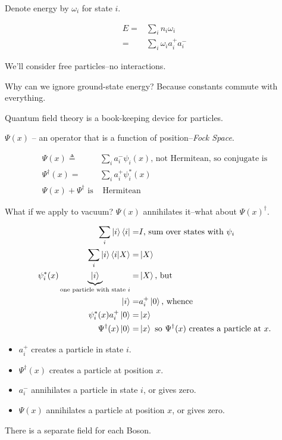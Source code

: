 \documentclass[]{article}
\begin{document}
Denote energy by $\omega_i$ for state $i$. 

\begin{align*}
E =& \sum_{i} n_i \omega_i\\
=& \sum_{i} \omega_i a^+_i a^-_i 
\end{align*}

We'll consider free particles--no interactions.

Why can we ignore ground-state energy? Because constants commute with everything. 

Quantum field theory is a book-keeping device for particles.

$\Psi(x)$ -- an operator that is a function of position--\emph{Fock Space}.

\begin{align*}
\Psi(x)\triangleq&\sum_{i}a^-_i\psi_i(x)\text{, not Hermitean, so conjugate is}\\
\Psi^\dagger(x)=&\sum_{i}a^+_i\psi_i^*(x)\\
\Psi(x)+\Psi^\dagger \text{ is}&\text{ Hermitean}
\end{align*}

What if we apply to vacuum? $\Psi(x)$ annihilates it--what about $\Psi(x)^\dagger$.

\begin{align*}
\sum_{i} \ket{i} \bra{i} =& I \text{, sum over states with $\psi_i$}\\
\sum_{i} \ket{i} \braket{i|X} =& \ket{X}\\
\psi^*_i(x)\underbrace{\ket{i}}_\text{one particle with state $i$} =& \ket{X}\text{, but}\\
\ket{i} =& a^+_i\ket{0} \text{, whence}\\
\psi^*_i(x) a^+_i\ket{0}=&\ket{x}\\
\Psi^\dagger(x) \ket{0} =& \ket{x}\text{ so $\Psi^\dagger(x)$ creates a particle at $x$.}
\end{align*}

\begin{itemize}
	\item $a^+_i$ creates a particle in state $i$.
	\item $\Psi^\dagger(x)$  creates a particle at position $x$.
	\item $a^-_i$ annihilates a particle in state $i$, or gives zero.
	\item $\Psi(x)$  annihilates a particle at position $x$, or gives zero.
\end{itemize}

There is a separate field for each Boson.
\end{document}
